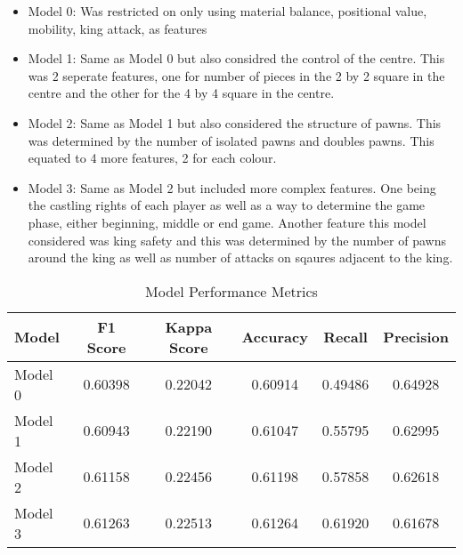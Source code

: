 \begin{itemize}
    \item Model 0: Was restricted on only using material balance, positional value, mobility, king attack, as features
    \item Model 1: Same as Model 0 but also considred the control of the centre. This was 2 seperate features, one for number of pieces in the 
    2 by 2 square in the centre and the other for the 4 by 4 square in the centre.
    \item Model 2: Same as Model 1 but also considered the structure of pawns. This was determined by the number of isolated pawns and doubles pawns. This equated to 4 more features, 2 for each colour.
    \item Model 3: Same as Model 2 but included more complex features. One being the castling rights of each player as well as a way to determine the game phase, either beginning, middle or end game. Another feature this model considered was king safety and this was determined by the number of pawns around the king as well as number of attacks on sqaures adjacent to the king.
\end{itemize}

\begin{table}[h]
    \centering
    \caption{Model Performance Metrics}
    \begin{tabular}{lccccc}
        \toprule
        Model  & F1 Score & Kappa Score & Accuracy & Recall & Precision \\
        \midrule
        Model 0 & 0.60398  & 0.22042  & 0.60914  & 0.49486  & 0.64928  \\
        Model 1 & 0.60943  & 0.22190  & 0.61047  & 0.55795  & 0.62995  \\
        Model 2 & 0.61158  & 0.22456  & 0.61198  & 0.57858  & 0.62618  \\
        Model 3 & 0.61263  & 0.22513  & 0.61264  & 0.61920  & 0.61678  \\
        \bottomrule
    \end{tabular}
\end{table}


